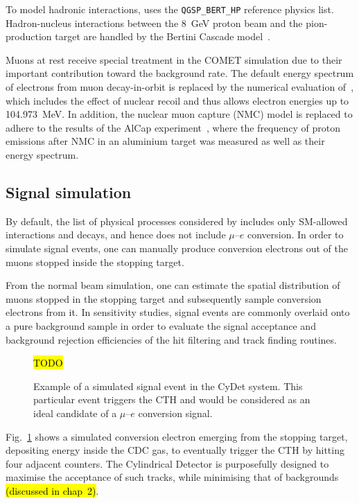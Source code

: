 To model hadronic interactions, \SimG uses the \texttt{QGSP\_BERT\_HP} reference physics list. Hadron-nucleus interactions between the \SI{8}{\GeV} proton beam and the pion-production target are handled by the Bertini Cascade model~\cite{WRIGHT2015175}.

Muons at rest receive special treatment in the COMET simulation due to their important contribution toward the background rate. The default energy spectrum of electrons from muon decay-in-orbit is replaced by the numerical evaluation of~\cite{czarnecki}, which includes the effect of nuclear recoil and thus allows electron energies up to \SI{104.973}{\MeV}. In addition, the nuclear muon capture (NMC) model is replaced to adhere to the results of the AlCap experiment~\cite{litchfield2015status}, where the frequency of proton emissions after NMC in an aluminium target was measured as well as their energy spectrum.


\subsection{Signal simulation}
By default, the list of physical processes considered by \SimG includes only SM-allowed interactions and decays, and hence does not include $\mu$--$e$ conversion. In order to simulate signal events, one can manually produce conversion electrons out of the muons stopped inside the stopping target.

From the normal beam simulation, one can estimate the spatial distribution of muons stopped in the stopping target and subsequently sample conversion electrons from it. In sensitivity studies, signal events are commonly overlaid onto a pure background sample in order to evaluate the signal acceptance and background rejection efficiencies of the hit filtering and track finding routines. %

\begin{figure}
    \centering
    \hl{TODO}
    \caption{Example of a simulated signal event in the CyDet system. This particular event triggers the CTH and would be considered as an ideal candidate of a $\mu$--$e$ conversion signal.}
    \label{fig:signal_event}
\end{figure}

Fig.~\ref{fig:signal_event} shows a simulated conversion electron emerging from the stopping target, depositing energy inside the CDC gas, to eventually trigger the CTH by hitting four adjacent counters. 
The Cylindrical Detector is purposefully designed to maximise the acceptance of such tracks, while minimising that of backgrounds \hl{(discussed in chap~2)}.%

